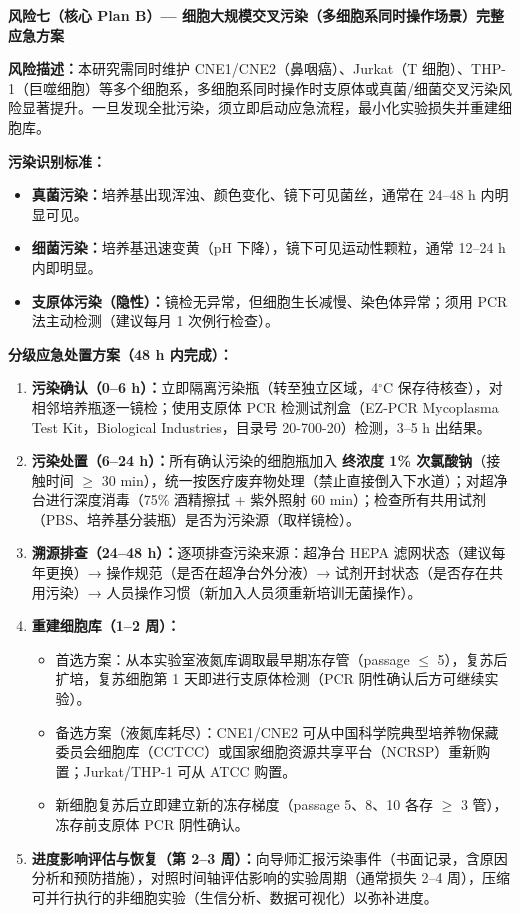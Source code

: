 \documentclass[12pt,a4paper,twoside]{article}
\begin{document}
\begin{warningbox}
\textbf{风险七（核心 Plan B）--- 细胞大规模交叉污染（多细胞系同时操作场景）完整应急方案}

\textbf{风险描述：}本研究需同时维护 CNE1/CNE2（鼻咽癌）、Jurkat（T 细胞）、THP-1（巨噬细胞）等多个细胞系，多细胞系同时操作时支原体或真菌/细菌交叉污染风险显著提升。一旦发现全批污染，须立即启动应急流程，最小化实验损失并重建细胞库。

\textbf{污染识别标准：}
\begin{itemize}
  \item \textbf{真菌污染：}培养基出现浑浊、颜色变化、镜下可见菌丝，通常在 24--48 h 内明显可见。
  \item \textbf{细菌污染：}培养基迅速变黄（pH 下降），镜下可见运动性颗粒，通常 12--24 h 内即明显。
  \item \textbf{支原体污染（隐性）：}镜检无异常，但细胞生长减慢、染色体异常；须用 PCR 法主动检测（建议每月 1 次例行检查）。
\end{itemize}

\textbf{分级应急处置方案（48 h 内完成）：}
\begin{enumerate}
  \item \textbf{污染确认（0--6 h）：}立即隔离污染瓶（转至独立区域，4$^{\circ}$C 保存待核查），对相邻培养瓶逐一镜检；使用支原体 PCR 检测试剂盒（EZ-PCR Mycoplasma Test Kit，Biological Industries，目录号 20-700-20）检测，3--5 h 出结果。
  \item \textbf{污染处置（6--24 h）：}所有确认污染的细胞瓶加入 \textbf{终浓度 1\% 次氯酸钠}（接触时间 $\geq$ 30 min），统一按医疗废弃物处理（禁止直接倒入下水道）；对超净台进行深度消毒（75\% 酒精擦拭 + 紫外照射 60 min）；检查所有共用试剂（PBS、培养基分装瓶）是否为污染源（取样镜检）。
  \item \textbf{溯源排查（24--48 h）：}逐项排查污染来源：超净台 HEPA 滤网状态（建议每年更换）→ 操作规范（是否在超净台外分液）→ 试剂开封状态（是否存在共用污染）→ 人员操作习惯（新加入人员须重新培训无菌操作）。
  \item \textbf{重建细胞库（1--2 周）：}
  \begin{itemize}
    \item 首选方案：从本实验室液氮库调取最早期冻存管（passage $\leq$ 5），复苏后扩培，复苏细胞第 1 天即进行支原体检测（PCR 阴性确认后方可继续实验）。
    \item 备选方案（液氮库耗尽）：CNE1/CNE2 可从中国科学院典型培养物保藏委员会细胞库（CCTCC）或国家细胞资源共享平台（NCRSP）重新购置；Jurkat/THP-1 可从 ATCC 购置。
    \item 新细胞复苏后立即建立新的冻存梯度（passage 5、8、10 各存 $\geq$ 3 管），冻存前支原体 PCR 阴性确认。
  \end{itemize}
  \item \textbf{进度影响评估与恢复（第 2--3 周）：}向导师汇报污染事件（书面记录，含原因分析和预防措施），对照时间轴评估影响的实验周期（通常损失 2--4 周），压缩可并行执行的非细胞实验（生信分析、数据可视化）以弥补进度。
\end{enumerate}


\end{warningbox}
\end{document}
